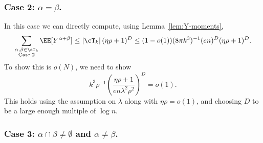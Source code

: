 \documentclass[11pt]{article}
\begin{document}
\subsubsection*{Case 2: $\alpha = \beta$.}

In this case we can directly compute, using Lemma~\ref{lem:Y-moments},
\[ \sum_{\substack{\alpha,\beta \in \cT_k \\ \textnormal{Case 2}}} \EE[Y^{\alpha+\beta}] \le |\cT_k| \, (\eta \rho + 1)^D \le (1-o(1))(8\pi k^3)^{-1} (en)^D (\eta \rho + 1)^D. \]
To show this is $o(N)$, we need to show
\[ k^3 \rho^{-1} \left(\frac{\eta\rho+1}{en \lambda^2 \rho^2}\right)^D = o(1). \]
This holds using the assumption on $\lambda$ along with $\eta\rho = o(1)$, and choosing $D$ to be a large enough multiple of $\log n$.



\subsubsection*{Case 3: $\alpha \cap \beta \ne \emptyset$ and $\alpha \ne \beta$.}
\end{document}

